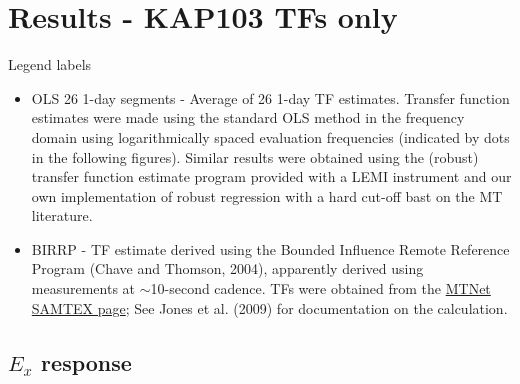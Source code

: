 \documentclass{article}
\begin{document}
\clearpage

\section{Results - KAP103 TFs only}

Legend labels

\begin{itemize}

    \item OLS 26 1-day segments - Average of 26 1-day TF estimates. Transfer function estimates were made using the standard OLS method in the frequency domain using logarithmically spaced evaluation frequencies (indicated by dots in the following figures). Similar results were obtained using the (robust) transfer function estimate program provided with a LEMI instrument and our own implementation of robust regression with a hard cut-off bast on the MT literature.

    \item BIRRP - TF estimate derived using the Bounded Influence Remote Reference Program (Chave and Thomson, 2004), apparently derived using measurements at $\sim$10-second cadence. TFs were obtained from the \href{https://www.mtnet.info/data/samtex/samtex.html}{MTNet SAMTEX page}; See Jones et al. (2009) for documentation on the calculation.

\end{itemize}

\clearpage

\subsection{$E_x$ response}
\end{document}
